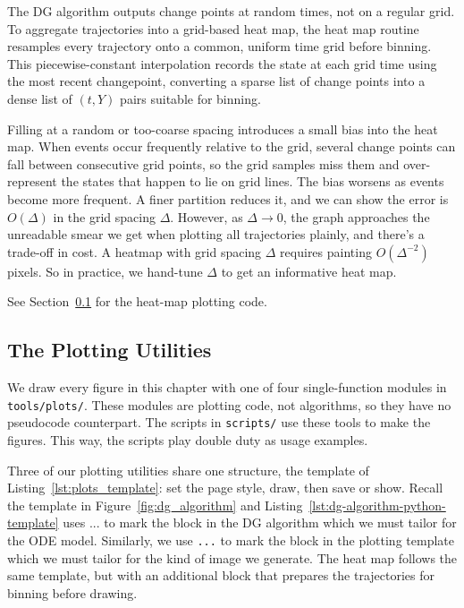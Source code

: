 The DG algorithm outputs change points at random times, not on a regular grid. To aggregate trajectories into a grid-based heat map, the heat map routine resamples every trajectory onto a common, uniform time grid before binning.
This piecewise-constant interpolation records the state at each grid time using the most recent changepoint, converting a sparse list of change points into a dense list of $(t, Y)$ pairs suitable for binning.

Filling at a random or too-coarse spacing introduces a small bias into the heat map.
When events occur frequently relative to the grid, several change points can fall between consecutive grid points, so the grid samples miss them and over-represent the states that happen to lie on grid lines. The bias worsens as events become more frequent. A finer partition reduces it, and we can show the error is $O(\Delta)$ in the grid spacing $\Delta$.
However, as $\Delta \to 0$, the graph approaches the unreadable smear we get when plotting all trajectories plainly, and there's a trade-off in cost. A heatmap with grid spacing $\Delta$ requires painting $O(\Delta^{-2})$ pixels. So in practice, we hand-tune $\Delta$ to get an informative heat map.

See Section~\ref{subsec:plotting_utilities} for the heat-map plotting code.

\subsection{The Plotting Utilities}\label{subsec:plotting_utilities}

We draw every figure in this chapter with one of four single-function modules in \texttt{tools/plots/}.
These modules are plotting code, not algorithms, so they have no pseudocode counterpart.
The scripts in \texttt{scripts/} use these tools to make the figures.
This way, the scripts play double duty as usage examples.

Three of our plotting utilities share one structure, the template of Listing~\ref{lst:plots_template}: set the page style, draw, then save or show.
Recall the template in Figure~\ref{fig:dg_algorithm} and Listing~\ref{lst:dg-algorithm-python-template} uses $\texttt{...}$ to mark the block in the DG algorithm which we must tailor for the ODE model.
Similarly, we use \texttt{...} to mark the block in the plotting template which we must tailor for the kind of image we generate.
The heat map follows the same template, but with an additional block that prepares the trajectories for binning before drawing.

